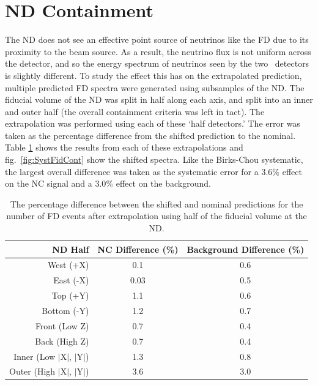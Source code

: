 \section{ND Containment}

The ND does not see an effective point source of neutrinos like the FD due to its proximity to the beam source. As a result, the neutrino flux is not uniform across the detector, and so the energy spectrum of neutrinos seen by the two \nova~detectors is slightly different. To study the effect this has on the extrapolated prediction, multiple predicted FD spectra were generated using subsamples of the ND. The fiducial volume of the ND was split in half along each axis, and split into an inner and outer half (the overall containment criteria was left in tact). The extrapolation was performed using each of these `half detectors.' The error was taken as the percentage difference from the shifted prediction to the nominal. Table \ref{tab:SystFidCont} shows the results from each of these extrapolations and fig.~\ref{fig:SystFidCont} show the shifted spectra. Like the Birks-Chou systematic, the largest overall difference was taken as the systematic error for a $3.6\%$ effect on the NC signal and a $3.0\%$ effect on the background.
\begin{table}[h]
  \begin{center}
    \caption[ND Containment Systematic Errors]{The percentage difference between the shifted and nominal predictions for the number of FD events after extrapolation using half of the fiducial volume at the ND.}
    \label{tab:SystFidCont}
    \begin{tabular}{r c c}
      \hline\hline
      ND Half & NC Difference (\%) & Background Difference (\%) \\
      \hline
      West (+X) & 0.1 & 0.6 \\
      East (-X) & 0.03 & 0.5 \\
      Top (+Y) & 1.1 & 0.6 \\
      Bottom (-Y) & 1.2 & 0.7 \\
      Front (Low Z) & 0.7 & 0.4 \\
      Back (High Z) & 0.7 & 0.4 \\
      Inner (Low $\vert$X$\vert$, $\vert$Y$\vert$) & 1.3 & 0.8 \\
      Outer (High $\vert$X$\vert$, $\vert$Y$\vert$) & 3.6 & 3.0 \\
      \hline
    \end{tabular}
  \end{center}
\end{table}

